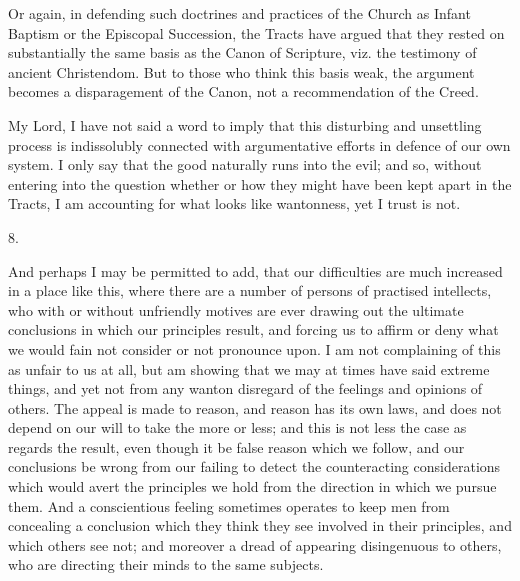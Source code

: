 Or again, in defending such doctrines and
practices of the Church as Infant Baptism or the Episcopal Succession,
the Tracts have argued that they rested on substantially the same
basis as the Canon of Scripture, viz. the testimony of ancient
Christendom. But to those who think this basis weak, the argument
becomes a disparagement of the Canon, not a recommendation of the
Creed.

My Lord, I have not said a word to imply that
this disturbing and unsettling process is indissolubly connected with
argumentative efforts in defence of our own system. I only say
that the good naturally runs into the evil; and so, without entering
into the question whether or how they might have been kept apart in
the Tracts, I am accounting for what looks like wantonness, yet I
trust is not.

8.

And perhaps I may be permitted to add, that our
difficulties are much increased in a place like this, where there are
a number of persons of practised intellects, who with or without
unfriendly motives are ever drawing out the ultimate conclusions in
which our principles result, and forcing us to affirm or deny what we
would fain not consider or not pronounce upon. I am not complaining of
this as unfair to us at all, but am showing that we may at times have
said extreme things, and yet not from any wanton disregard of the
feelings and opinions of others. The appeal is made to reason, and
reason has its own laws, and does not depend on our will to take the
more or less; and this is not less the case as regards the result,
even though it be false reason which we follow, and our conclusions be
wrong from our failing to detect the counteracting considerations
which would avert the principles we hold from the direction in which
we pursue them. And a conscientious feeling sometimes operates to keep
men from concealing a conclusion which they think they see involved in
their principles, and which others see not; and moreover a dread of
appearing disingenuous to others, who are directing their minds to the
same subjects.

